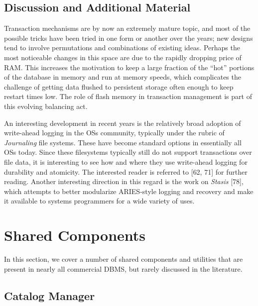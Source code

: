 \documentclass[b5paper,11pt,twoside,openright]{book}
\begin{document}
\hypertarget{discussion-and-additional-material-4}{%
\section{Discussion and Additional
Material}\label{discussion-and-additional-material-4}}

Transaction mechanisms are by now an extremely mature topic, and most of
the possible tricks have been tried in one form or another over the
years; new designs tend to involve permutations and combinations of
existing ideas. Perhaps the most noticeable changes in this space are
due to the rapidly dropping price of RAM. This increases the motivation
to keep a large fraction of the ``hot'' portions of the database in
memory and run at memory speeds, which complicates the challenge of
getting data flushed to persistent storage often enough to keep restart
times low. The role of flash memory in transaction management is part of
this evolving balancing act.

An interesting development in recent years is the relatively broad
adoption of write-ahead logging in the OSs community, typically under
the rubric of \emph{Journaling} file systems. These have become standard
options in essentially all OSs today. Since these filesystems typically
still do not support transactions over file data, it is interesting to
see how and where they use write-ahead logging for durability and
atomicity. The interested reader is referred to {[}62, 71{]} for further
reading. Another interesting direction in this regard is the work on
\emph{Stasis} {[}78{]}, which attempts to better modularize ARIES-style
logging and recovery and make it available to systems programmers for a
wide variety of uses.

\hypertarget{shared-components}{%
\chapter{Shared Components}\label{shared-components}}

In this section, we cover a number of shared components and utilities
that are present in nearly all commercial DBMS, but rarely discussed in
the literature.

\hypertarget{catalog-manager}{%
\section{Catalog Manager}\label{catalog-manager}}
\end{document}
